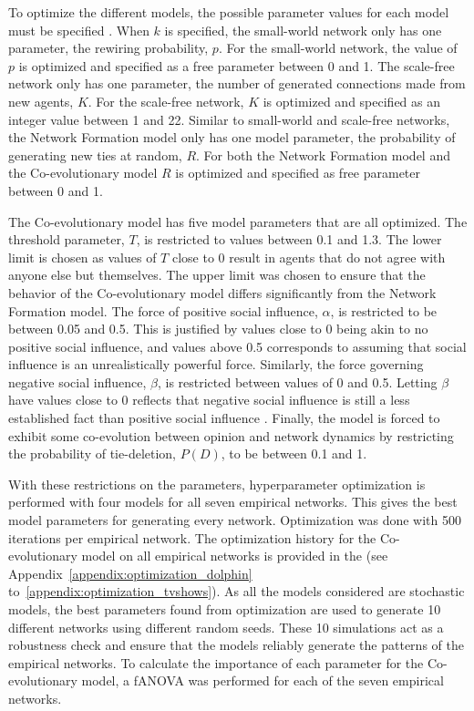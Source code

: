 \documentclass[11pt]{article}
\begin{document}
\noindent To optimize the different models, the possible parameter values for each model must be specified \cite{akiba_optuna_2019}. When $k$ is specified, the small-world network only has one parameter, the rewiring probability, $p$. For the small-world network, the value of $p$ is optimized and specified as a free parameter between 0 and 1. The scale-free network only has one parameter, the number of generated connections made from new agents, $K$. For the scale-free network, $K$ is optimized and specified as an integer value between 1 and 22. Similar to small-world and scale-free networks, the Network Formation model only has one model parameter, the probability of generating new ties at random, $R$. For both the Network Formation model and the Co-evolutionary model $R$ is optimized and specified as free parameter between 0 and 1.

The Co-evolutionary model has five model parameters that are all optimized. The threshold parameter, $T$, is restricted to values between 0.1 and 1.3. The lower limit is chosen as values of $T$ close to 0 result in agents that do not agree with anyone else but themselves. The upper limit was chosen to ensure that the behavior of the Co-evolutionary model differs significantly from the Network Formation model. 
The force of positive social influence, $\alpha$, is restricted to be between 0.05 and 0.5. This is justified by values close to 0 being akin to no positive social influence, and values above 0.5 corresponds to assuming that social influence is an unrealistically powerful force. Similarly, the force governing negative social influence, $\beta$, is restricted between values of 0 and 0.5. Letting $\beta$ have values close to 0 reflects that negative social influence is still a less established fact than positive social influence \cite{takacs_is_2014, turner_paths_2018}. Finally, the model is forced to exhibit some co-evolution between opinion and network dynamics by restricting the probability of tie-deletion, $P(D)$, to be between 0.1 and 1. 

\noindent With these restrictions on the parameters, hyperparameter optimization is performed with four models for all seven empirical networks. This gives the best model parameters for generating every network. Optimization was done with 500 iterations per empirical network. The optimization history for the Co-evolutionary model on all empirical networks is provided in the \textit{} (see Appendix~\ref{appendix:optimization_dolphin} to~\ref{appendix:optimization_tvshows}). As all the models considered are stochastic models, the best parameters found from optimization are used to generate 10 different networks using different random seeds. These 10 simulations act as a robustness check and ensure that the models reliably generate the patterns of the empirical networks. To calculate the importance of each parameter for the Co-evolutionary model, a fANOVA was performed for each of the seven empirical networks.
\end{document}
